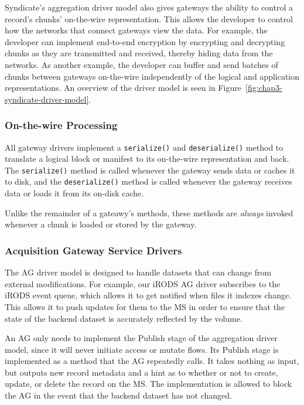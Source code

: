 Syndicate's aggregation driver model also gives gateways the ability to
control a record's chunks' on-the-wire representation.  This allows the
developer to control how the networks that connect gateways view the data.  For
example, the developer can implement end-to-end encryption by encrypting and
decrypting chunks as they are transmitted and received, thereby hiding
data from the networks.  As another example, the developer can buffer and send
batches of chunks between gateways on-the-wire independently of the logical and
application representations.  An overview of the driver model is seen in
Figure~\ref{fig:chap3-syndicate-driver-model}.

\subsubsection{On-the-wire Processing}

All gateway drivers implement a \texttt{serialize()} and \texttt{deserialize()}
method to translate a logical block or manifest to its on-the-wire
representation and back.  The \texttt{serialize()} method is called whenever the gateway sends
data or caches it to disk, and the \texttt{deserialize()} method is called
whenever the gateway receives data or loads it from its on-disk cache.

Unlike the remainder of a gateawy's methods, these methods are \emph{always}
invoked whenever a chunk is loaded or stored by the gateway.

\subsubsection{Acquisition Gateway Service Drivers}

The AG driver model is designed to handle datasets that can change from
external modifications.  For example, our iRODS AG driver
subscribes to the iRODS event queue, which allows it to get notified
when files it indexes change.  This allows it to push updates for them to the MS
in order to ensure that the state of the backend dataset is accurately reflected
by the volume.

 An AG only needs to implement the Publish stage of
the aggregation driver model, since it will never initiate access or mutate
flows.  Its Publish stage is implemented as a method that the AG repeatedly
calls.  It takes nothing as input, but outputs new record metadata and a
hint as to whether or not to create, update, or delete the record on the MS.  The
implementation is allowed to block the AG in the event that the backend dataset
has not changed.

